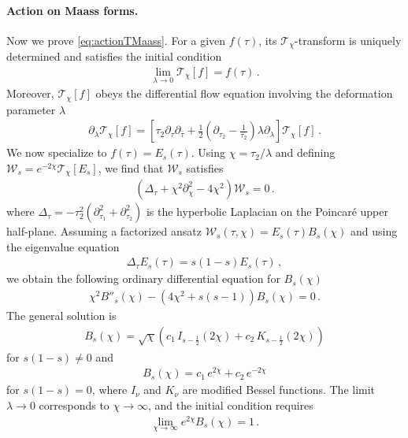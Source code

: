 \documentclass[aps,twocolumn,prl,showpacs,amsmath,amssymb,10pt]{revtex4-2}
\begin{document}
\paragraph{Action on Maass forms.}
Now we prove \eqref{eq:actionTMaass}.
For a given $f(\tau)$, its $\mathcal{T}_{\chi}$-transform is uniquely determined and satisfies the initial condition
\begin{align}
\lim_{\lambda\to 0}\mathcal{T}_{\chi}[f]=f(\tau)\,.
\end{align}
Moreover, $\mathcal{T}_{\chi}[f]$ obeys the differential flow equation involving the deformation parameter $\lambda$ \cite{Cardy:2018sdv,Aharony:2018bad}
\begin{align}
\label{eq:flowEq}
\partial_{\lambda}\mathcal{T}_{\chi}[f]=\left[\tau_2\partial_{\tau}\partial_{\bar{\tau}}+\frac{1}{2}\left(\partial_{\tau_2}-\frac{1}{\tau_2} \right)\lambda\partial_{\lambda}\right]\mathcal{T}_{\chi}[f]\,.
\end{align}
We now specialize to $f(\tau)=E_s(\tau)$. Using $\chi=\tau_2/\lambda$ and defining $\mathcal{W}_s=e^{-2\chi}\mathcal{T}_{\chi}[E_s]$, we find that $\mathcal{W}_s$ satisfies
\begin{align}
\label{eq:W}
\left(\Delta_{\tau}+\chi^2\partial_{\chi}^2-4\chi^2 \right)\mathcal{W}_s=0\,.
\end{align}
where $\Delta_{\tau}=-\tau_2^2(\partial_{\tau_1}^2+\partial_{\tau_2}^2)$ is the hyperbolic Laplacian on the Poincaré upper half-plane. Assuming a factorized ansatz $\mathcal{W}_s(\tau,\chi)=E_s(\tau)B_s(\chi)$ and using the eigenvalue equation
\begin{align}
\Delta_{\tau}E_s(\tau)=s(1-s)E_s(\tau)\,,
\end{align}
we obtain the following ordinary differential equation for $B_s(\chi)$
\begin{align}
\chi^2B''_s(\chi)-(4\chi^2+s(s-1))B_s(\chi)=0\,.
\end{align}
The general solution is
\begin{align}
B_s(\chi)=\sqrt{\chi}\left(c_1\,I_{s-\frac{1}{2}}(2\chi)+c_2\,K_{s-\frac{1}{2}}(2\chi) \right)
\end{align}
for $s(1-s)\ne 0$ and
\begin{align}
B_s(\chi)=
c_1\,e^{2\chi}+c_2\,e^{-2\chi}
\end{align}
for $s(1-s)=0$, where $I_{\nu}$ and $K_{\nu}$ are modified Bessel functions. The limit $\lambda\to 0$ corresponds to $\chi\to\infty$, and the initial condition requires
\begin{align}
\lim_{\chi\to\infty}e^{2\chi}B_s(\chi)=1\,.
\end{align}
\end{document}
